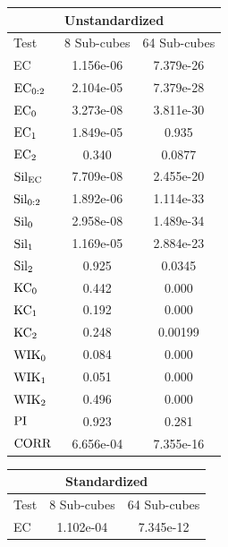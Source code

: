 \documentclass[12pt]{article}
\begin{document}
\begin{table}[htp!]
    \begin{center}
        \begin{tabular}{ l | c | c }
          \toprule
          \multicolumn{3}{c}{Unstandardized} \\
          \toprule
          Test & 8 Sub-cubes & 64 Sub-cubes \\
          \midrule
          EC & 1.156e-06 & 7.379e-26 \\
          $\textup{EC}_{0:2}$ & 2.104e-05 & 7.379e-28 \\
          $\textup{EC}_{0}$ & 3.273e-08 & 3.811e-30 \\
          $\textup{EC}_{1}$ &  1.849e-05 & 0.935 \\
          $\textup{EC}_{2}$ & 0.340 & 0.0877 \\
          \midrule
          $\textup{Sil}_{\textup{EC}}$ & 7.709e-08 & 2.455e-20 \\
          $\textup{Sil}_{0:2}$ & 1.892e-06 & 1.114e-33 \\
          $\textup{Sil}_{0}$ & 2.958e-08 & 1.489e-34 \\
          $\textup{Sil}_{1}$ & 1.169e-05 & 2.884e-23 \\
          $\textup{Sil}_{2}$ & 0.925 & 0.0345 \\
          \midrule
          $\textup{KC}_{0}$ & 0.442 & 0.000 \\
          $\textup{KC}_{1}$ & 0.192 & 0.000 \\
          $\textup{KC}_{2}$ & 0.248 & 0.00199 \\
          \midrule
          $\textup{WIK}_{0}$ & 0.084 & 0.000 \\
          $\textup{WIK}_{1}$ & 0.051 & 0.000 \\
          $\textup{WIK}_{2}$ & 0.496 & 0.000 \\
          $\textup{PI}$ & 0.923 & 0.281 \\
          \midrule
          $\textup{CORR}$ & 6.656e-04 & 7.355e-16 \\
          \bottomrule
        \end{tabular}
        \begin{tabular}{ l | c |  c }
          \toprule
          \multicolumn{3}{c}{Standardized} \\
          \toprule
          Test & 8 Sub-cubes& 64 Sub-cubes \\
          \midrule
          EC & 1.102e-04 &  7.345e-12 \\

\end{tabular}
\end{center}
\end{table}
\end{document}
